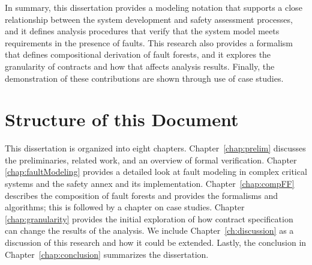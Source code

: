 In summary, this dissertation provides a modeling notation that supports a close relationship between the system development and safety assessment processes, and it defines analysis procedures that verify that the system model meets requirements in the presence of faults. This research also provides a formalism that defines compositional derivation of fault forests, and it explores the granularity of contracts and how that affects analysis results. Finally, the demonstration of these contributions are shown through use of case studies. 

\section{Structure of this Document}
This dissertation is organized into eight chapters. Chapter~\ref{chap:prelim} discusses the preliminaries, related work, and an overview of formal verification. Chapter \ref{chap:faultModeling} provides a detailed look at fault modeling in complex critical systems and the safety annex and its implementation. Chapter~\ref{chap:compFF} describes the composition of fault forests and provides the formalisms and algorithms; this is followed by a chapter on case studies. Chapter \ref{chap:granularity} provides the initial exploration of how contract specification can change the results of the analysis. We include Chapter~\ref{ch:discussion} as a discussion of this research and how it could be extended. Lastly, the conclusion in Chapter~\ref{chap:conclusion} summarizes the dissertation.











